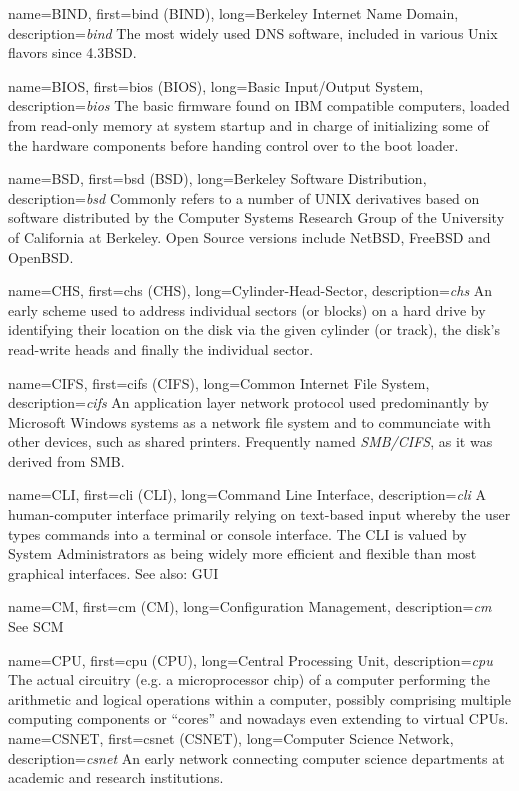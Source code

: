 {
	name={BIND},
	first={\acrlong{bind} (BIND)},
	long={Berkeley Internet Name Domain},
	description={{\em \acrlong{bind}} The most widely used DNS
software, included in various Unix flavors since
4.3BSD.}
}

{
	name={BIOS},
	first={\acrlong{bios} (BIOS)},
	long={Basic Input/Output System},
	description={{\em \acrlong{bios}} The basic firmware found on
IBM compatible computers, loaded from read-only memory at system startup
and in charge of initializing some of the hardware components before
handing control over to the boot loader.}
}

{
	name={BSD},
	first={\acrlong{bsd} (BSD)},
	long={Berkeley Software Distribution},
	description={{\em \acrlong{bsd}} Commonly refers to a number of
UNIX derivatives based on software distributed by the Computer Systems
Research Group of the University of California at Berkeley.  Open Source
versions include NetBSD, FreeBSD and OpenBSD.}
}

{
	name={CHS},
	first={\acrlong{chs} (CHS)},
	long={Cylinder-Head-Sector},
	description={{\em \acrlong{chs}} An early scheme used to address
individual sectors (or blocks) on a hard drive by identifying their
location on the disk via the given cylinder (or track), the disk's
read-write heads and finally the individual sector.}
}

{
	name={CIFS},
	first={\acrlong{cifs} (CIFS)},
	long={Common Internet File System},
	description={{\em \acrlong{cifs}} An application layer network
protocol used predominantly by Microsoft Windows systems as a network file
system and to communciate with other devices, such as shared printers.
Frequently named {\em SMB/CIFS}, as it was derived from SMB.}
}

{
	name={CLI},
	first={\acrlong{cli} (CLI)},
	long={Command Line Interface},
	description={{\em \acrlong{cli}} A
human-computer interface primarily relying on
text-based input whereby the user types commands into
a terminal or console interface.  The CLI is valued by
System Administrators as being widely more efficient
and flexible than most graphical interfaces.  See
also: GUI}
}


{
	name={CM},
	first={\acrlong{cm} (CM)},
	long={Configuration Management},
	description={{\em \acrlong{cm}} See SCM}
}

{
	name={CPU},
	first={\acrlong{cpu} (CPU)},
	long={Central Processing Unit},
	description={{\em \acrlong{cpu}} The actual
circuitry (e.g. a microprocessor chip) of a computer
performing the arithmetic and logical operations
within a computer, possibly comprising multiple
computing components or ``cores'' and nowadays even
extending to virtual CPUs.}
}
{
	name={CSNET},
	first={\acrlong{csnet} (CSNET)},
	long={Computer Science Network},
	description={{\em \acrlong{csnet}} An early network connecting
computer science departments at academic and research
institutions.}
}

